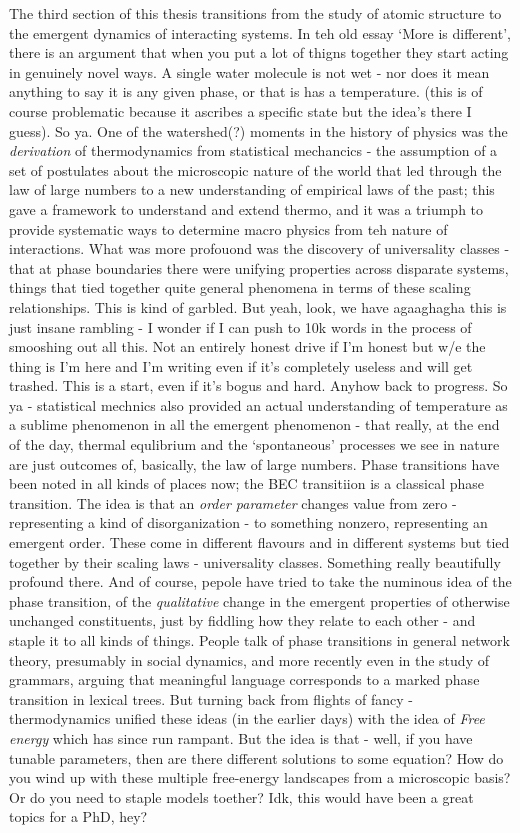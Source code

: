 The third section of this thesis transitions from the study of atomic
structure to the emergent dynamics of interacting systems.
	In teh old
essay `More is different', there is an argument that when you put a lot
of thigns together they start acting in genuinely novel ways.
	A single
water molecule is not wet - nor does it mean anything to say it is any
given phase, or that is has a temperature.
	(this is of course
problematic because it ascribes a specific state but the idea's there I
guess).
	So ya.
	One of the watershed(?) moments in the history of physics
was the \emph{derivation} of thermodynamics from statistical mechancics
- the assumption of a set of postulates about the microscopic nature of
the world that led through the law of large numbers to a new
understanding of empirical laws of the past; this gave a framework to
understand and extend thermo, and it was a triumph to provide systematic
ways to determine macro physics from teh nature of interactions.
	What
was more profouond was the discovery of universality classes - that at
phase boundaries there were unifying properties across disparate
systems, things that tied together quite general phenomena in terms of
these scaling relationships.
	This is kind of garbled.
	But yeah, look, we
have agaaghagha this is just insane rambling - I wonder if I can push to
10k words in the process of smooshing out all this.
	Not an entirely
honest drive if I'm honest but w/e the thing is I'm here and I'm writing
even if it's completely useless and will get trashed.
	This is a start,
even if it's bogus and hard.
	Anyhow back to progress.
	So ya -
statistical mechnics also provided an actual understanding of
temperature as a sublime phenomenon in all the emergent phenomenon -
that really, at the end of the day, thermal equlibrium and the
`spontaneous' processes we see in nature are just outcomes of,
basically, the law of large numbers.
	Phase transitions have been noted
in all kinds of places now; the BEC transitiion is a classical phase
transition.
	The idea is that an \emph{order parameter} changes value
from zero - representing a kind of disorganization - to something
nonzero, representing an emergent order.
	These come in different
flavours and in different systems but tied together by their scaling
laws - universality classes.
	Something really beautifully profound
there.
	And of course, pepole have tried to take the numinous idea of the
phase transition, of the \emph{qualitative} change in the emergent
properties of otherwise unchanged constituents, just by fiddling how
they relate to each other - and staple it to all kinds of things.
	People
talk of phase transitions in general network theory, presumably in
social dynamics, and more recently even in the study of grammars,
arguing that meaningful language corresponds to a marked phase
transition in lexical trees.
	But turning back from flights of fancy -
thermodynamics unified these ideas (in the earlier days) with the idea
of \emph{Free energy} which has since run rampant.
	But the idea is that
- well, if you have tunable parameters, then are there different
solutions to some equation? How do you wind up with these multiple
free-energy landscapes from a microscopic basis? Or do you need to
staple models toether? Idk, this would have been a great topics for a
PhD, hey?

